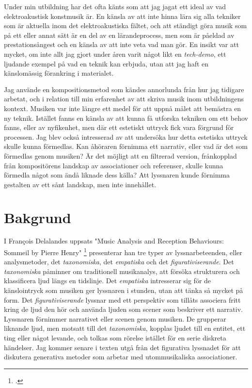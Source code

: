 \documentclass{article}
\begin{document}
Under min utbildning har det ofta känts som att jag jagat ett ideal av vad elektroakustisk konstmusik är. En
känsla av att inte hinna lära sig alla tekniker som är aktuella inom det elektroakustiska fältet, och att
ständigt göra musik som på ett eller annat sätt är en del av en lärandeprocess, men som är påeldad av
prestationsångest och en känsla av att inte veta vad man gör. En insikt var att mycket, om inte allt jag gjort
under åren varit något likt en \emph{tech-demo}, ett ljudande exempel på vad en teknik kan erbjuda, utan att jag
haft en känslomässig förankring i materialet.

Jag använde en kompositionsmetod som kändes annorlunda från hur jag tidigare arbetat, och i relation till min
erfarenhet av att skriva musik inom utbildningens kontext. 
% 
Musiken var inte längre ett medel för att uppnå målet att bemästra en ny teknik. Istället fanns en känsla av
att kunna få utforska tekniken om ett behov fanns, eller av nyfikenhet, men där ett estetiskt uttryck fick
vara förgrund för processen.
Jag blev också intresserad av att undersöka hur detta estetiska uttryck skulle kunna förmedlas. Kan åhöraren
förnimma ett narrativ, eller vad är det som förmedlas genom musiken? Är det möjligt att en filtrerad version,
frånkopplad från kompositörens landskap av associationer och referenser, skulle kunna förmedla något som ändå
liknade dess källa? Att lyssnaren kunde förnimma gestalten av ett sånt landskap, men inte innehållet.



\pagebreak
\section{Bakgrund}

I François Delalandes uppsats "Music Analysis and Reception Behaviours: Sommeil by Pierre Henry"
\footcite[26, 38, 52]{Delalande1998} presenterar han tre typer av lyssnarbeteenden, eller analysmetoder, det
\emph{taxonomiska}, det \emph{empatiska} och det \emph{figurativiserande}. Det \emph{taxonomiska} påminner om
traditionell musikanalys, att försöka strukturera och klassificera ljud längs en tidslinje. Det
\emph{empatiska} intresserar sig för de känslointryck som musiken ger lyssnaren i stunden, utan att tänka så mycket på
form. Det \emph{figurativiserande} lyssnar med ett perspektiv som tillåts associera fritt kring de
ljud den hör och använda ljuden som scener som beskriver ett narrativ. Lyssnaren förnimmer narrativet eller
scenen genom musiken. De grupperar liknande ljud, men motsatt till det \emph{taxonomiska}, kopplas ljudet till
en entitet, ett ting eller något levande, och tolkas som rörelse istället för en serie diskreta händelser. Jag
kommer senare i texten utgå från det figurativa lyssnadet för att diskutera generativa metoder som arbetar med
utommusikaliska associationer. 
\end{document}
